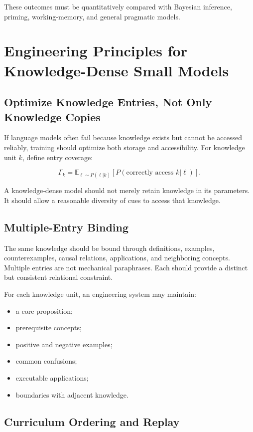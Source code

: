 \documentclass[11pt, a4paper]{article}
\begin{document}
These outcomes must be quantitatively compared with Bayesian inference, priming, working-memory, and general pragmatic models.



\section{Engineering Principles for Knowledge-Dense Small Models}


\subsection{Optimize Knowledge Entries, Not Only Knowledge Copies}


If language models often fail because knowledge exists but cannot be accessed reliably, training should optimize both storage and accessibility. For knowledge unit $k$, define entry coverage:


\[
\Gamma_k
=
\mathbb{E}_{\ell\sim P(\ell|k)}
\left[
P(\text{correctly access }k|\ell)
\right].
\tag{21}
\]

A knowledge-dense model should not merely retain knowledge in its parameters. It should allow a reasonable diversity of cues to access that knowledge.


\subsection{Multiple-Entry Binding}


The same knowledge should be bound through definitions, examples, counterexamples, causal relations, applications, and neighboring concepts. Multiple entries are not mechanical paraphrases. Each should provide a distinct but consistent relational constraint.


For each knowledge unit, an engineering system may maintain:


\begin{itemize}
\item a core proposition;
\item prerequisite concepts;
\item positive and negative examples;
\item common confusions;
\item executable applications;
\item boundaries with adjacent knowledge.
\end{itemize}


\subsection{Curriculum Ordering and Replay}
\end{document}
